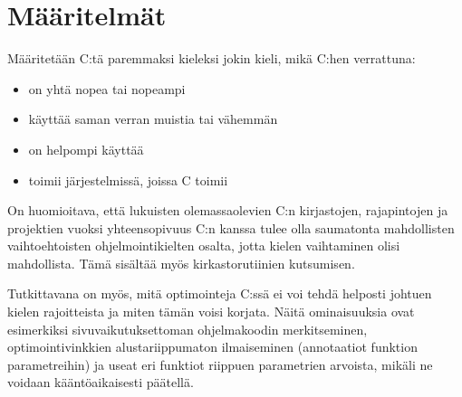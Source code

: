 \section{Määritelmät} 


Määritetään C:tä paremmaksi kieleksi jokin kieli, mikä C:hen verrattuna:

\begin{itemize}
    \item on yhtä nopea tai nopeampi
    \item käyttää saman verran muistia tai vähemmän
    \item on helpompi käyttää
    \item toimii järjestelmissä, joissa C toimii
\end{itemize}

On huomioitava, että lukuisten olemassaolevien C:n kirjastojen, rajapintojen ja
projektien vuoksi yhteensopivuus C:n kanssa tulee olla saumatonta mahdollisten
vaihtoehtoisten ohjelmointikielten osalta, jotta kielen vaihtaminen olisi
mahdollista. Tämä sisältää myös kirkastorutiinien kutsumisen.

Tutkittavana on myös, mitä optimointeja C:ssä ei voi tehdä helposti johtuen
kielen rajoitteista ja miten tämän voisi korjata. Näitä ominaisuuksia ovat
esimerkiksi sivuvaikutuksettoman ohjelmakoodin merkitseminen,
optimointivinkkien alustariippumaton ilmaiseminen (annotaatiot funktion
parametreihin) ja useat eri funktiot riippuen parametrien arvoista, mikäli ne
voidaan kääntöaikaisesti päätellä.
